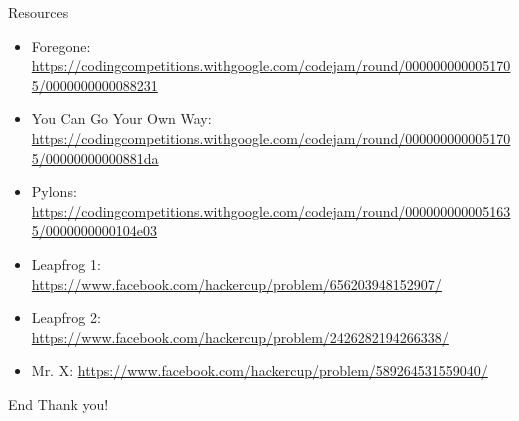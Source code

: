 \begin{frame}{Resources}
\begin{itemize}
  \item Foregone: \small \url{https://codingcompetitions.withgoogle.com/codejam/round/0000000000051705/0000000000088231}
  \item You Can Go Your Own Way: \small \url{https://codingcompetitions.withgoogle.com/codejam/round/0000000000051705/00000000000881da}
  \item Pylons: \small \url{https://codingcompetitions.withgoogle.com/codejam/round/0000000000051635/0000000000104e03}
  \item Leapfrog 1: \small \url{https://www.facebook.com/hackercup/problem/656203948152907/}
  \item Leapfrog 2: \small \url{https://www.facebook.com/hackercup/problem/2426282194266338/}
  \item Mr. X: \small \url {https://www.facebook.com/hackercup/problem/589264531559040/}
\end{itemize}
\end{frame}

\begin{frame}{End}
    \centering
    \Huge {Thank you!}
\end{frame}
